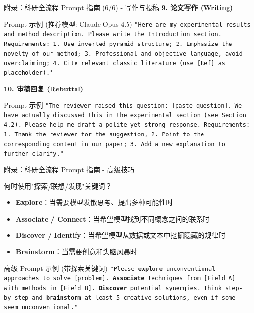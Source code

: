 \documentclass[aspectratio=169,11pt]{beamer}
\begin{document}
\begin{frame}{附录：科研全流程 Prompt 指南 (6/6) - 写作与投稿}
    \textbf{9. 论文写作 (Writing)}
    \begin{exampleblock}{Prompt 示例 (推荐模型: Claude Opus 4.5)}
        \small
        \texttt{"Here are my experimental results and method description. Please write the Introduction section. Requirements: 1. Use inverted pyramid structure; 2. Emphasize the novelty of our method; 3. Professional and objective language, avoid overclaiming; 4. Cite relevant classic literature (use [Ref] as placeholder)."}
    \end{exampleblock}
    
    \vspace{0.3cm}
    \textbf{10. 审稿回复 (Rebuttal)}
    \begin{exampleblock}{Prompt 示例}
        \small
        \texttt{"The reviewer raised this question: [paste question]. We have actually discussed this in the experimental section (see Section 4.2). Please help me draft a polite yet strong response. Requirements: 1. Thank the reviewer for the suggestion; 2. Point to the corresponding content in our paper; 3. Add a new explanation to further clarify."}
    \end{exampleblock}
\end{frame}

\begin{frame}{附录：科研全流程 Prompt 指南 - 高级技巧}
    \begin{block}{何时使用"探索/联想/发现"关键词？}
        \begin{itemize}
            \item \textbf{Explore}：当需要模型发散思考、提出多种可能性时
            \item \textbf{Associate / Connect}：当希望模型找到不同概念之间的联系时
            \item \textbf{Discover / Identify}：当希望模型从数据或文本中挖掘隐藏的规律时
            \item \textbf{Brainstorm}：当需要创意和头脑风暴时
        \end{itemize}
    \end{block}
    
    \vspace{0.3cm}
    \begin{exampleblock}{高级 Prompt 示例 (带探索关键词)}
        \small
        \texttt{"Please \textbf{explore} unconventional approaches to solve [problem]. \textbf{Associate} techniques from [Field A] with methods in [Field B]. \textbf{Discover} potential synergies. Think step-by-step and \textbf{brainstorm} at least 5 creative solutions, even if some seem unconventional."}
    \end{exampleblock}
\end{frame}
\end{document}
